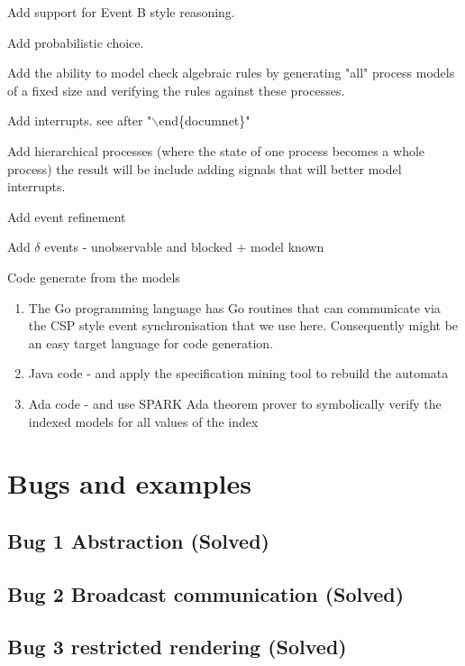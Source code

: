 \documentclass[]{article}
\begin{document}
\begin{enumerate}

{\bf
\item Add support for Event B style reasoning.
\item Add probabilistic choice.

\item Add the ability to model check  algebraic rules by generating "all" process models of a fixed size and verifying the rules against these processes.
\item Add interrupts.  see after "$\backslash$end\{documnet\}"
\item Add hierarchical processes (where the state of one process becomes a whole process)
 the result will be  include adding signals that will  better model interrupts.
\item Add event refinement
\item Add $\delta$ events - unobservable and blocked + model known
\item Code generate from the models

\begin{enumerate}
\item The Go programming language has Go routines that can communicate via  the CSP style event synchronisation that we use here. Consequently might be an easy target language for code  generation.

\item Java code -  and apply the specification mining tool to rebuild the automata
\item Ada code -  and use SPARK Ada theorem prover to symbolically  verify the indexed models for all values of the index
\end{enumerate}
}
\end{enumerate}



\newpage
\section{Bugs and examples}
\subsection{Bug 1  Abstraction             (Solved)}
\subsection{Bug 2  Broadcast communication (Solved)}
\subsection{Bug 3 restricted rendering     (Solved)}
\end{document}
